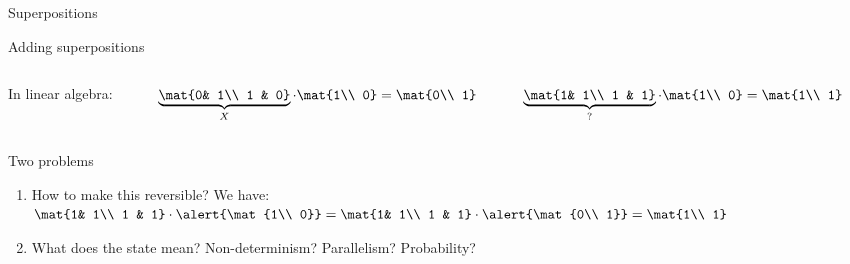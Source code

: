 \begin{frame}{Superpositions}
\begin{exampleblock}{Adding superpositions}
\pause
\begin{columns}
\begin{column}{.2\textwidth}
In linear algebra:\\
~
\end{column}
\begin{column}{.25\textwidth}
$\underbrace{\mat{0& 1\\ 1 & 0}}_{X}\cdot \mat{1\\ 0} =  \mat{0\\ 1}$
\end{column}
\begin{column}{.25\textwidth}
$\underbrace{\mat{1& 1\\ 1 & 1}}_{?}\cdot \mat{1\\ 0} =  \mat{1\\ 1}$
\end{column}
\end{columns}



\vspace{1ex}
\vspace{1ex}
\vspace{1ex}

\vspace{1ex}
\end{exampleblock}


\pause
\begin{alertblock}{Two problems}
\begin{enumerate}
	\item How to make this \alert{reversible}? We have:
$\mat{1& 1\\ 1 & 1}\cdot \alert{\mat{1\\ 0}} =  \mat{1& 1\\ 1 & 1}\cdot 
   \alert{\mat{0\\ 1}} =  \mat{1\\ 1}$
\pause
	\item What does the state  mean? Non-determinism? Parallelism? Probability?
\end{enumerate}
\end{alertblock}

\end{frame}




